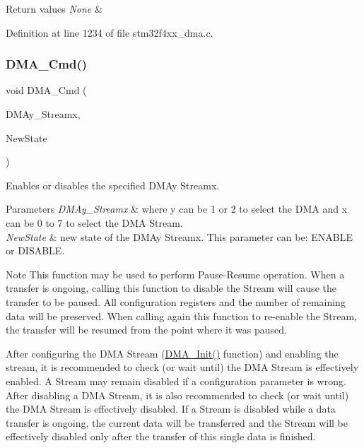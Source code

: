 \begin{DoxyRetVals}{Return values}
{\em None} & \\
\hline
\end{DoxyRetVals}


Definition at line 1234 of file stm32f4xx\+\_\+dma.\+c.

\mbox{\label{group___d_m_a_gab2bea22f9f6dc62fdd7afb385a0c1f73}} 
\subsubsection{\texorpdfstring{D\+M\+A\+\_\+\+Cmd()}{DMA\_Cmd()}}
{\footnotesize\ttfamily void D\+M\+A\+\_\+\+Cmd (\begin{DoxyParamCaption}\item[{\hyperlink{struct_d_m_a___stream___type_def}{D\+M\+A\+\_\+\+Stream\+\_\+\+Type\+Def} $\ast$}]{D\+M\+Ay\+\_\+\+Streamx,  }\item[{Functional\+State}]{New\+State }\end{DoxyParamCaption})}



Enables or disables the specified D\+M\+Ay Streamx. 


\begin{DoxyParams}{Parameters}
{\em D\+M\+Ay\+\_\+\+Streamx} & where y can be 1 or 2 to select the D\+MA and x can be 0 to 7 to select the D\+MA Stream. \\
\hline
{\em New\+State} & new state of the D\+M\+Ay Streamx. This parameter can be\+: E\+N\+A\+B\+LE or D\+I\+S\+A\+B\+LE.\\
\hline
\end{DoxyParams}
\begin{DoxyNote}{Note}
This function may be used to perform Pause-\/\+Resume operation. When a transfer is ongoing, calling this function to disable the Stream will cause the transfer to be paused. All configuration registers and the number of remaining data will be preserved. When calling again this function to re-\/enable the Stream, the transfer will be resumed from the point where it was paused.

After configuring the D\+MA Stream (\hyperlink{group___d_m_a___group1_gaced8a4149acfb0a50b50e63273a87148}{D\+M\+A\+\_\+\+Init()} function) and enabling the stream, it is recommended to check (or wait until) the D\+MA Stream is effectively enabled. A Stream may remain disabled if a configuration parameter is wrong. After disabling a D\+MA Stream, it is also recommended to check (or wait until) the D\+MA Stream is effectively disabled. If a Stream is disabled while a data transfer is ongoing, the current data will be transferred and the Stream will be effectively disabled only after the transfer of this single data is finished.
\end{DoxyNote}

